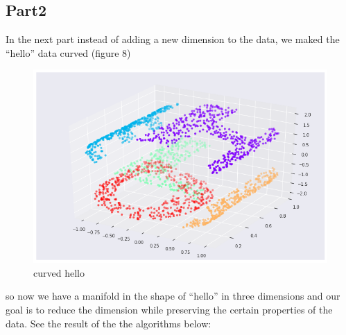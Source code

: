 \documentclass[a4paper]{article}
\begin{document}
\subsection{Part2}
In the next part instead of adding a new dimension to the data, we maked the “hello” data curved (figure 8)
\begin{figure}[H]
\centering
\includegraphics[scale = 0.32]{curved_hello.png}
\caption{\label{fig:curved_hello}curved hello}
\end{figure}
so now we have a manifold in the shape of “hello” in three dimensions and our goal is to reduce the dimension while preserving the certain properties of the data. 
\newpage 
See the result of the the algorithms below:
\end{document}
